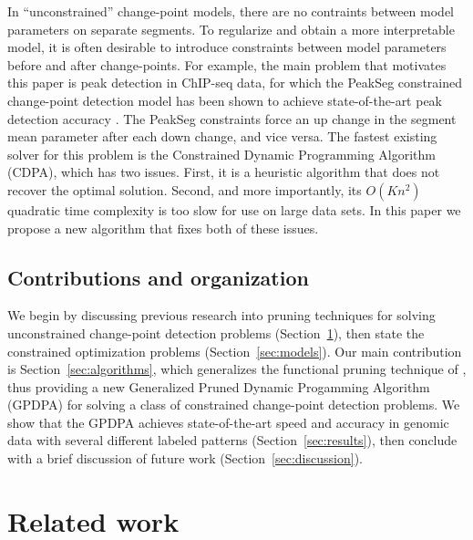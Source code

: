 \documentclass{article}
\begin{document}
In ``unconstrained'' change-point models, there are no contraints
between model parameters on separate segments. To regularize and obtain a more
interpretable model, it is often desirable to introduce constraints
between model parameters before and after change-points. 
For example, the main problem that motivates this paper is peak detection in
ChIP-seq data, for which the \mbox{PeakSeg} constrained change-point
detection model has been shown to achieve state-of-the-art peak
detection accuracy \citep{HOCKING-PeakSeg}. The \mbox{PeakSeg}
constraints force an up change in the segment mean parameter after
each down change, and vice versa.
The fastest existing solver for this problem is the Constrained
Dynamic Programming Algorithm (CDPA), which has two issues. First, it
is a heuristic algorithm that does not recover the optimal
solution. Second, and more importantly, its $O(Kn^2)$ quadratic time
complexity is too slow for use on large data sets.  In this paper we
propose a new algorithm that fixes both of these issues.

\subsection{Contributions and organization}

We begin by discussing previous research into pruning techniques for
solving unconstrained change-point detection problems
(Section~\ref{sec:related}), then state the constrained optimization
problems (Section~\ref{sec:models}). Our main contribution is
Section~\ref{sec:algorithms}, which generalizes the functional pruning
technique of \citet{pruned-dp}, thus providing a new Generalized
Pruned Dynamic Progamming Algorithm (GPDPA) for solving a class of
constrained change-point detection problems. We show that the GPDPA
achieves state-of-the-art speed and accuracy in genomic data with
several different labeled patterns (Section~\ref{sec:results}), then
conclude with a brief discussion of future work
(Section~\ref{sec:discussion}).

\section{Related work}
\label{sec:related}
\end{document}
